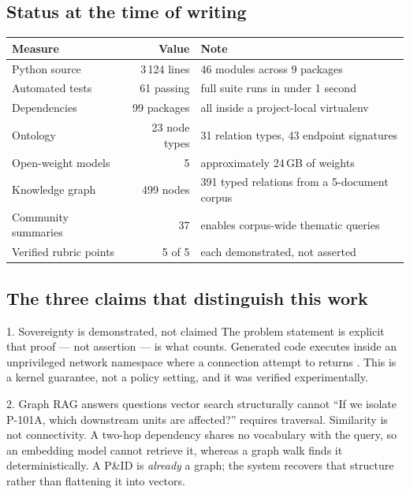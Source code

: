 \subsection{Status at the time of writing}

\begin{center}
\renewcommand{\arraystretch}{1.25}
\begin{tabularx}{\linewidth}{@{}l r X@{}}
\toprule
\textbf{Measure} & \textbf{Value} & \textbf{Note} \\
\midrule
Python source          & 3\,124 lines & 46 modules across 9 packages \\
Automated tests        & 61 passing   & full suite runs in under 1 second \\
Dependencies           & 99 packages  & all inside a project-local virtualenv \\
Ontology               & 23 node types & 31 relation types, 43 endpoint signatures \\
Open-weight models     & 5            & approximately 24\,GB of weights \\
Knowledge graph        & 499 nodes    & 391 typed relations from a 5-document corpus \\
Community summaries    & 37           & enables corpus-wide thematic queries \\
Verified rubric points & 5 of 5       & each demonstrated, not asserted \\
\bottomrule
\end{tabularx}
\end{center}

\subsection{The three claims that distinguish this work}

\begin{keybox}{1. Sovereignty is demonstrated, not claimed}
The problem statement is explicit that proof --- not assertion --- is what
counts. Generated code executes inside an unprivileged network namespace where
a connection attempt to  returns
. This is a kernel guarantee, not a
policy setting, and it was verified experimentally.
\end{keybox}

\begin{keybox}{2. Graph RAG answers questions vector search structurally cannot}
``If we isolate P-101A, which downstream units are affected?'' requires
traversal. Similarity is not connectivity. A two-hop dependency shares no
vocabulary with the query, so an embedding model cannot retrieve it, whereas a
graph walk finds it deterministically. A P\&ID is \emph{already} a graph; the
system recovers that structure rather than flattening it into vectors.
\end{keybox}

